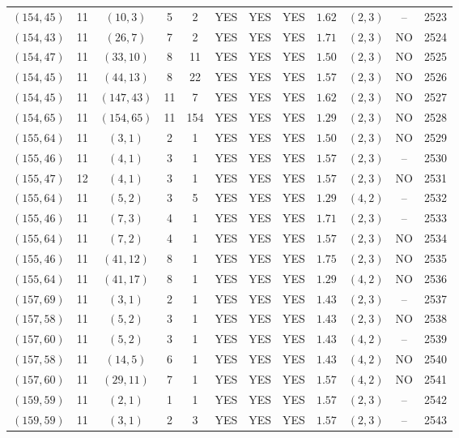 \begin{longtable}{|c|c|c|c|c|c|c|c|c|c|c|c|}
$(154,45)$ & 11 & $(10,3)$ & 5 & 2 & YES & YES & YES & $1.62$ & $(2,3)$ & -- & 2523\\
$(154,43)$ & 11 & $(26,7)$ & 7 & 2 & YES & YES & YES & $1.71$ & $(2,3)$ & NO & 2524\\
$(154,47)$ & 11 & $(33,10)$ & 8 & 11 & YES & YES & YES & $1.50$ & $(2,3)$ & NO & 2525\\
$(154,45)$ & 11 & $(44,13)$ & 8 & 22 & YES & YES & YES & $1.57$ & $(2,3)$ & NO & 2526\\
$(154,45)$ & 11 & $(147,43)$ & 11 & 7 & YES & YES & YES & $1.62$ & $(2,3)$ & NO & 2527\\
$(154,65)$ & 11 & $(154,65)$ & 11 & 154 & YES & YES & YES & $1.29$ & $(2,3)$ & NO & 2528\\
$(155,64)$ & 11 & $(3,1)$ & 2 & 1 & YES & YES & YES & $1.50$ & $(2,3)$ & NO & 2529\\
$(155,46)$ & 11 & $(4,1)$ & 3 & 1 & YES & YES & YES & $1.57$ & $(2,3)$ & -- & 2530\\
$(155,47)$ & 12 & $(4,1)$ & 3 & 1 & YES & YES & YES & $1.57$ & $(2,3)$ & NO & 2531\\
$(155,64)$ & 11 & $(5,2)$ & 3 & 5 & YES & YES & YES & $1.29$ & $(4,2)$ & -- & 2532\\
$(155,46)$ & 11 & $(7,3)$ & 4 & 1 & YES & YES & YES & $1.71$ & $(2,3)$ & -- & 2533\\
$(155,64)$ & 11 & $(7,2)$ & 4 & 1 & YES & YES & YES & $1.57$ & $(2,3)$ & NO & 2534\\
$(155,46)$ & 11 & $(41,12)$ & 8 & 1 & YES & YES & YES & $1.75$ & $(2,3)$ & NO & 2535\\
$(155,64)$ & 11 & $(41,17)$ & 8 & 1 & YES & YES & YES & $1.29$ & $(4,2)$ & NO & 2536\\
$(157,69)$ & 11 & $(3,1)$ & 2 & 1 & YES & YES & YES & $1.43$ & $(2,3)$ & -- & 2537\\
$(157,58)$ & 11 & $(5,2)$ & 3 & 1 & YES & YES & YES & $1.43$ & $(2,3)$ & NO & 2538\\
$(157,60)$ & 11 & $(5,2)$ & 3 & 1 & YES & YES & YES & $1.43$ & $(4,2)$ & -- & 2539\\
$(157,58)$ & 11 & $(14,5)$ & 6 & 1 & YES & YES & YES & $1.43$ & $(4,2)$ & NO & 2540\\
$(157,60)$ & 11 & $(29,11)$ & 7 & 1 & YES & YES & YES & $1.57$ & $(4,2)$ & NO & 2541\\
$(159,59)$ & 11 & $(2,1)$ & 1 & 1 & YES & YES & YES & $1.57$ & $(2,3)$ & -- & 2542\\
$(159,59)$ & 11 & $(3,1)$ & 2 & 3 & YES & YES & YES & $1.57$ & $(2,3)$ & -- & 2543\\

\end{longtable}
